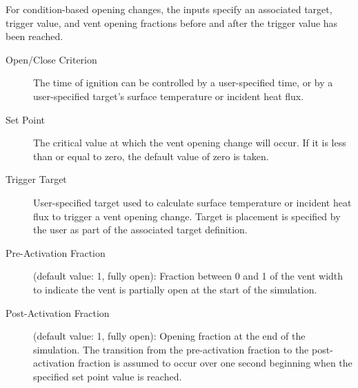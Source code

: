 
For condition-based opening changes, the inputs specify an associated target, trigger value, and vent opening fractions before and after the trigger value has been reached.

\begin{description}
\item[Open/Close Criterion] The time of ignition can be controlled by a user-specified time, or by a user-specified target's surface temperature or incident heat flux.
\item[Set Point] The critical value at which the vent opening change will occur. If it is less than or equal to zero, the default value of zero is taken.
\item[Trigger Target] User-specified target used to calculate surface temperature or incident heat flux to trigger a vent opening change. Target is placement is specified by the user as part of the associated target definition.
\item[Pre-Activation Fraction] (default value: 1, fully open): Fraction between 0 and 1 of the vent width to indicate the vent is partially open at the start of the simulation.
\item[Post-Activation Fraction] (default value: 1, fully open): Opening fraction at the end of the simulation. The transition from the pre-activation fraction to the post-activation fraction is assumed to occur over one second beginning when the specified set point value is reached.
\end{description}




